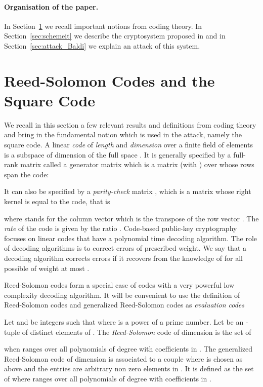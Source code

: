 \documentclass[runningheads,11pt]{llncs}
\begin{document}
\medskip

\paragraph{\bf Organisation of the paper.} In Section~\ref{sec:basics} we recall important notions from coding theory. 
In Section~\ref{sec:schemeit} we describe 
the cryptosystem proposed in \cite{BBCRS11a} and in
Section~\ref{sec:attack_Baldi}  we explain an attack of this system.
 
\section{Reed-Solomon Codes and the Square Code}
\label{sec:basics}
We recall in this section a few relevant results and definitions from coding theory and bring in the
fundamental notion which is used in the attack, namely the square code.
A linear \emph{code}  of {\em length}  and {\em dimension}  over a finite field  of  elements is a subspace of dimension  of the full
space . 
 It is generally specified by a 
full-rank matrix called a generator matrix which is a  matrix  (with ) over  whose
rows span the code:
 
 It can also be specified by a {\em parity-check} matrix , which is a matrix whose right kernel is equal to 
 the code, that is
 
 where  stands for the column vector which is the transpose of the row vector .
 The {\em rate} of the code is 
given by the ratio .
Code-based public-key cryptography focuses on linear codes that have a polynomial time decoding algorithm. The role of decoding 
algorithms is to correct  errors of prescribed weight. We say that a decoding algorithm
corrects  errors if it recovers  from the
knowledge of  for all possible
 of weight at most . 


Reed-Solomon codes form a special case of codes with a very powerful low complexity decoding algorithm.
It will be convenient to use the definition of Reed-Solomon codes and generalized Reed-Solomon codes as
{\em evaluation codes} 
\begin{definition} \label{defGRS}
Let  and  be integers such that  where  is a power of
a prime number.
Let  be an -tuple of distinct elements of
. 
The \emph{Reed-Solomon} code   of dimension  is the set of 

when  ranges over all polynomials of degree 
with coefficients in .
The generalized Reed-Solomon code  of dimension  is associated to a couple 
 where  is chosen as above and
the entries  are arbitrary non zero elements in . 
It is defined as the set of  
where  ranges over all polynomials of degree 
with coefficients in .
\end{definition}
\end{document}
